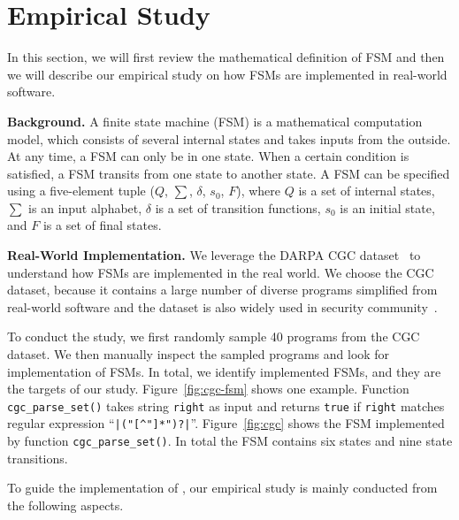 \section{Empirical Study}
\label{sec:study}
In this section, we will first review the mathematical definition of FSM and then
we will describe our empirical study on how FSMs are implemented 
in real-world software. 

\noindent\textbf{Background.}
A finite state machine (FSM) is a mathematical computation model, 
which consists of several internal states and takes inputs from the outside.
At any time, a FSM can only be in one state. 
When a certain condition is satisfied, 
a FSM transits from one state to another state. 
A FSM can be specified using a five-element tuple ($Q$, $\sum$, $\delta$, $s_0$, $F$),
where $Q$ is a set of internal states, $\sum$ is an input alphabet, 
$\delta$ is a set of transition functions,
$s_0$ is an initial state, and $F$ is a set of final states. 

\noindent\textbf{Real-World Implementation.}
We leverage the DARPA CGC dataset~\cite{CGC} to 
understand how FSMs are implemented in the real world. 
We choose the CGC dataset, because it 
contains a large number of diverse programs simplified 
from real-world software and the dataset 
is also widely used in security 
community~\cite{QSYM, Driller, VUzzer}. 


To conduct the study, we first randomly sample 
40 programs from the CGC dataset.
We then manually inspect the sampled programs and look for implementation of FSMs.
In total, we identify {\color{red}{XXX}} implemented FSMs, 
and they are the targets of our study.
Figure~\ref{fig:cgc-fsm} shows one example.
Function \texttt{cgc\_parse\_set()} takes string \texttt{right} 
as input and returns \texttt{true} if \texttt{right} matches 
regular expression ``\verb/|("[^"]*")?|/''. 
Figure~\ref{fig:cgc} shows the FSM implemented by function \texttt{cgc\_parse\_set()}. 
In total the FSM contains six states 
and nine state transitions. 







To guide the implementation of \Tool{}, our empirical study 
is mainly conducted from the following aspects.


